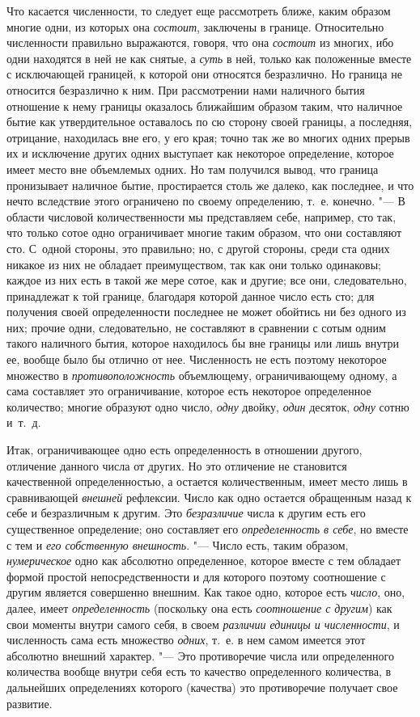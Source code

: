 Что касается численности, то следует еще рассмотреть ближе, каким образом
многие одни, из которых она {\em состоит}, заключены в
границе. Относительно численности правильно выражаются, говоря, что она
{\em состоит} из многих, ибо одни находятся в ней не
как снятые, а {\em суть} в ней, только как положенные
вместе с исключающей границей, к которой они относятся безразлично. Но
граница не относится безразлично к ним. При рассмотрении нами наличного
бытия отношение к нему границы оказалось ближайшим образом таким, что
наличное бытие как утвердительное оставалось по сю сторону своей границы, а
последняя, отрицание, находилась вне его, у его края; точно так же во
многих одних прерыв их и исключение других одних выступает как некоторое
определение, которое имеет место вне объемлемых одних. Но там получился
вывод, что граница пронизывает наличное бытие, простирается столь же
далеко, как последнее, и что нечто вследствие этого ограничено по своему
определению, т.~е. конечно. "--- В области числовой количественности мы
представляем себе, например, сто так, что только сотое одно ограничивает
многие таким образом, что они составляют сто. С~одной стороны, это
правильно; но, с другой стороны, среди ста одних никакое из них не обладает
преимуществом, так как они только одинаковы; каждое из них есть в такой же
мере сотое, как и другие; все они, следовательно, принадлежат к той
границе, благодаря которой данное число есть сто; для получения своей
определенности последнее не может обойтись ни без одного из них; прочие
одни, следовательно, не составляют в сравнении с сотым одним такого
наличного бытия, которое находилось бы вне границы или лишь внутри ее,
вообще было бы отлично от нее. Численность не есть поэтому некоторое
множество в {\em противоположность} объемлющему,
ограничивающему одному, а сама составляет это ограничивание, которое есть
некоторое определенное количество; многие образуют одно число,
{\em одну} двойку, {\em один}
десяток, {\em одну} сотню и~т.~д.

Итак, ограничивающее одно есть определенность в отношении другого, отличение
данного числа от других. Но это отличение не становится качественной
определенностью, а остается количественным, имеет место лишь в сравнивающей
{\em внешней} рефлексии. Число как одно остается
обращенным назад к себе и безразличным к другим. Это
{\em безразличие} числа к другим есть его существенное
определение; оно составляет его {\em определенность в
себе}, но вместе с тем и {\em его собственную
внешность}. "--- Число есть, таким образом,
{\em нумерическое} одно как абсолютно определенное,
которое вместе с тем обладает формой простой непосредственности и для
которого поэтому соотношение с другим является совершенно внешним. Как
такое одно, которое есть {\em число}, оно, далее, имеет
{\em определенность} (поскольку она есть
{\em соотношение с другим}) как свои моменты внутри
самого себя, в своем {\em различии единицы и
численности}, и численность сама есть множество
{\em одних}, т.~е. в нем самом имеется этот абсолютно
внешний характер. "--- Это противоречие числа или определенного количества
вообще внутри себя есть то качество определенного количества, в дальнейших
определениях которого (качества) это противоречие получает свое развитие.

